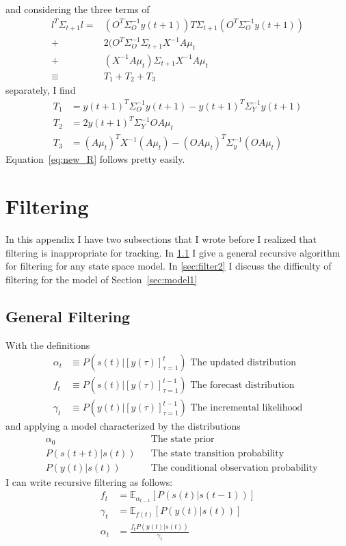 \documentclass[12pt]{article}
\newcommand{\field}[1]{\mathbb{#1}}
\newcommand{\EV}[2]{\field{E}_{#1}\left[#2\right]}
\newcommand{\os}[4]{{\left[ #1(#2) \right]}_{#3}^{#4}} %
\newcommand{\ti}[2]{{#1}{(#2)}}                         %
\newcommand{\ts}[4]{\os{#1}{#2}{#2=#3}{#4}} %
\begin{document}
and considering the three terms of
\begin{align*}
  l^T \Sigma_{t+1} l = & (O^T\Sigma_O^{-1} \ti{y}{t+1})T \Sigma_{t+1}
  (O^T\Sigma_O^{-1} \ti{y}{t+1}) \\
  + & 2(O^T\Sigma_O^{-1} \Sigma_{t+1} X^{-1}A\mu_t \\
  + & (X^{-1}A\mu_t)\Sigma_{t+1} X^{-1}A\mu_t \\
  \equiv & T_1+T_2+T_3
\end{align*}
separately, I find
\begin{align*}
  T_1 &= \ti{y}{t+1}^T \Sigma_O^{-1} \ti{y}{t+1} - \ti{y}{t+1}^T
  \Sigma_Y^{-1} \ti{y}{t+1} \\
  T_2 &= 2 \ti{y}{t+1}^T \Sigma_Y^{-1} OA\mu_t \\
  T_3 &= (A\mu_t)^T X^{-1} (A\mu_t) - (OA\mu_t)^T
  \Sigma_y^{-1}(OA\mu_t)
\end{align*}
Equation~\eqref{eq:new_R} follows pretty easily.

\section{Filtering}
\label{sec:filtering}

In this appendix I have two subsections that I wrote before I
realized that filtering is inappropriate for tracking.  In
\ref{sec:filtering1} I give a general recursive algorithm for filtering
for any state space model.  In \ref{sec:filter2} I discuss the
difficulty of filtering for the model of Section~\ref{sec:model1}


\subsection{General Filtering}
\label{sec:filtering1}

With the definitions
\begin{align}
  \label{def:alpha}
  \alpha_t &\equiv P(\ti{s}{t}|\ts{y}{\tau}{1}{t}) \text{ The updated distribution} \\
  f_t &\equiv P(\ti{s}{t}|\ts{y}{\tau}{1}{t-1}) \text{ The forecast
    distribution} \\
  \gamma_t &\equiv P(\ti{y}{t}|\ts{y}{\tau}{1}{t-1}) \text{ The
    incremental likelihood}
\end{align}
and applying a model characterized by the distributions
\begin{align}
  \label{def:alpha0}
  &\alpha_0  &&\text{The state prior} \\
  &P(\ti{s}{t+t}|\ti{s}{t}) &&\text{The state transition probability} \\
  &P(\ti{y}{t}|\ti{s}{t}) &&\text{The conditional observation probability}
\end{align}
I can write recursive filtering as follows:
\begin{align}
  f_t &= \EV{\alpha_{t-1}} {P(\ti{s}{t}|\ti{s}{t-1})} \\
  \gamma_t &= \EV{\ti{f}{t}} {P(\ti{y}{t}|\ti{s}{t})} \\
  \alpha_t &= \frac{f_t P(\ti{y}{t}|\ti{s}{t})}{\gamma_t} \\
\end{align}
\end{document}

